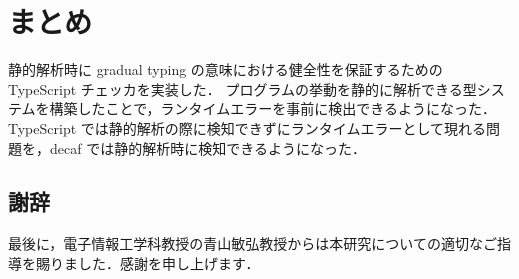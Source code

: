 \chapter{まとめ}

静的解析時に gradual typing の意味における健全性を保証するための TypeScript チェッカを実装した．
プログラムの挙動を静的に解析できる型システムを構築したことで，ランタイムエラーを事前に検出できるようになった．
TypeScript では静的解析の際に検知できずにランタイムエラーとして現れる問題を，decaf では静的解析時に検知できるようになった．

\section{謝辞}

最後に，電子情報工学科教授の青山敏弘教授からは本研究についての適切なご指導を賜りました．感謝を申し上げます．
